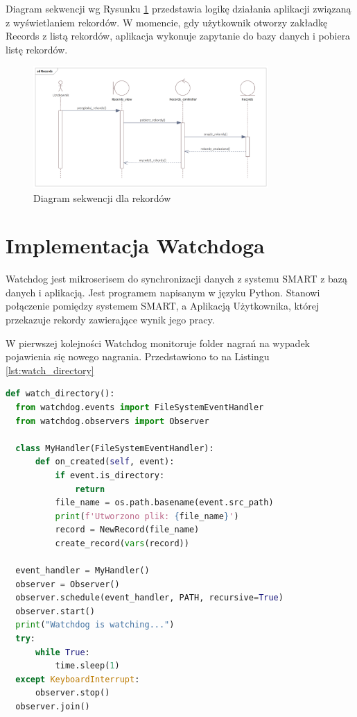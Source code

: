 \documentclass{sprz}
\begin{document}
Diagram sekwencji wg Rysunku \ref{img:sequence_records} przedstawia logikę działania aplikacji związaną z wyświetlaniem rekordów. W momencie, gdy użytkownik otworzy zakładkę Records z listą rekordów, aplikacja wykonuje zapytanie do bazy danych i pobiera listę rekordów.

\begin{figure}[h]
  \centering
  \includegraphics[width=0.8\textwidth]{sprz/sequence_records}
  \caption{Diagram sekwencji dla rekordów}
  \label{img:sequence_records}
\end{figure}

\chapter{Implementacja Watchdoga}

Watchdog jest mikroserisem do synchronizacji danych z systemu SMART z bazą danych i aplikacją. Jest programem napisanym w języku Python. Stanowi połączenie pomiędzy systemem SMART, a Aplikacją Użytkownika, której przekazuje rekordy zawierające wynik jego pracy. 

W pierwszej kolejności Watchdog monitoruje folder nagrań na wypadek pojawienia się nowego nagrania. Przedstawiono to na Listingu \ref{lst:watch_directory}

\begin{lstlisting}[language=Python,caption={Funkcja służąca do monitorowania folderu z nagraniami}, label={lst:watch_directory}]
  def watch_directory():
  from watchdog.events import FileSystemEventHandler
  from watchdog.observers import Observer

  class MyHandler(FileSystemEventHandler):
      def on_created(self, event):
          if event.is_directory:
              return
          file_name = os.path.basename(event.src_path)
          print(f'Utworzono plik: {file_name}')
          record = NewRecord(file_name)
          create_record(vars(record))

  event_handler = MyHandler()
  observer = Observer()
  observer.schedule(event_handler, PATH, recursive=True)
  observer.start()
  print("Watchdog is watching...")
  try:
      while True:
          time.sleep(1)
  except KeyboardInterrupt:
      observer.stop()
  observer.join()
  \end{lstlisting}
\end{document}
